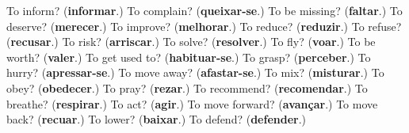 \begin{tcolorbox}[breakable,colback=teal!4,colframe=teal!35!black,title={Before you move on}]
To inform? (\textbf{informar}.) To complain? (\textbf{queixar-se}.) To be missing? (\textbf{faltar}.) To deserve? (\textbf{merecer}.) To improve? (\textbf{melhorar}.) To reduce? (\textbf{reduzir}.) To refuse? (\textbf{recusar}.) To risk? (\textbf{arriscar}.) To solve? (\textbf{resolver}.) To fly? (\textbf{voar}.) To be worth? (\textbf{valer}.) To get used to? (\textbf{habituar-se}.) To grasp? (\textbf{perceber}.) To hurry? (\textbf{apressar-se}.) To move away? (\textbf{afastar-se}.) To mix? (\textbf{misturar}.) To obey? (\textbf{obedecer}.) To pray? (\textbf{rezar}.) To recommend? (\textbf{recomendar}.) To breathe? (\textbf{respirar}.) To act? (\textbf{agir}.) To move forward? (\textbf{avançar}.) To move back? (\textbf{recuar}.) To lower? (\textbf{baixar}.) To defend? (\textbf{defender}.)
\end{tcolorbox}
